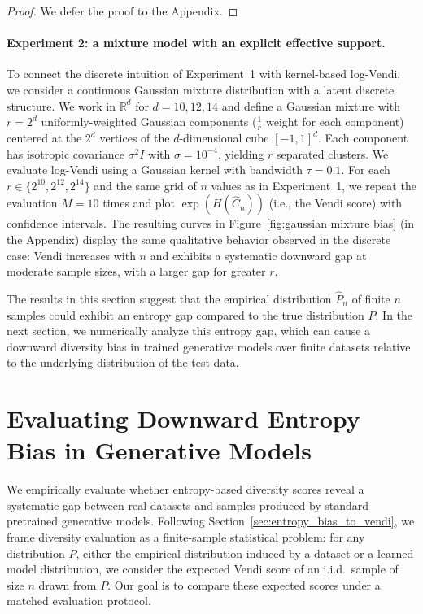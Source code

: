 \documentclass{article}
\theoremstyle{plain}
\theoremstyle{definition}
\begin{document}
\begin{proof}We defer the proof to the Appendix.\end{proof}


\paragraph{Experiment 2: a mixture model with an explicit effective support.}
To connect the discrete intuition of Experiment~1 with kernel-based log-Vendi, we consider a continuous Gaussian mixture distribution with a latent discrete structure.
We work in $\mathbb{R}^d$ for $d=10,12,14$ and define a Gaussian mixture with $r=2^d$ uniformly-weighted Gaussian components ($\frac{1}{r}$ weight for each component) centered at the $2^d$ vertices of the $ d$-dimensional cube $[-1,1]^d$.
Each component has isotropic covariance $\sigma^2 I$ with $\sigma=10^{-4}$, yielding $r$ separated clusters.
We evaluate log-Vendi using a Gaussian kernel with bandwidth $\tau=0.1$.
For each $r\in\{2^{10},2^{12},2^{14}\}$ and the same grid of $n$ values as in Experiment~1, we repeat the evaluation $M=10$ times
and plot $\exp(H(\widehat{C}_n))$ (i.e., the Vendi score) with confidence intervals.
The resulting curves in Figure~\ref{fig:gaussian mixture bias} (in the Appendix) display the same qualitative behavior observed in the discrete case:
Vendi increases with $n$ and exhibits a systematic downward gap at moderate sample sizes, with a larger gap for greater $r$.\vspace{1mm}

The results in this section suggest that the empirical distribution $\widehat{P}_n$ of finite $n$ samples could exhibit an entropy gap compared to the true distribution $P$. In the next section, we numerically analyze this entropy gap, which can cause a downward diversity bias in trained generative models over finite datasets relative to the underlying distribution of the test data.




\section{Evaluating Downward Entropy Bias in Generative Models}
\label{sec:eval_downward_bias}


We empirically evaluate whether entropy-based diversity scores reveal a systematic gap between real datasets and samples produced by standard pretrained generative models.
Following Section~\ref{sec:entropy_bias_to_vendi}, we frame diversity evaluation as a finite-sample statistical problem:
for any distribution $P$, either the empirical distribution induced by a dataset or a learned model distribution, we consider the expected Vendi score of an i.i.d.\ sample of size $n$ drawn from $P$.
Our goal is to compare these expected scores under a matched evaluation protocol.\vspace{1mm}
\end{document}
